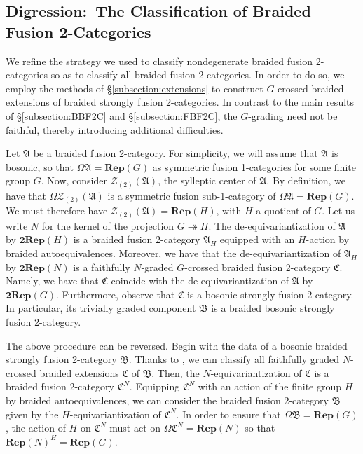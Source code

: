 \documentclass[11pt,reqno]{amsart}
\numberwithin{equation}{section}
\theoremstyle{plain}
\theoremstyle{definition}
\begin{document}
\subsection{Digression:\ The Classification of Braided Fusion 2-Categories}\label{subsection:allBraided}

We refine the strategy we used to classify nondegenerate braided fusion 2-categories so as to classify all braided fusion 2-categories.
In order to do so, we employ the methods of \S\ref{subsection:extensions} to construct $G$-crossed braided extensions of braided strongly fusion 2-categories. In contrast to the main results of \S\ref{subsection:BBF2C} and \S\ref{subsection:FBF2C}, the $G$-grading need not be faithful, thereby introducing additional difficulties.

Let $\mathfrak{A}$ be a braided fusion 2-category.
For simplicity, we will assume that $\mathfrak{A}$ is bosonic, so that $\Omega\mathfrak{A} = \mathbf{Rep}(G)$ as symmetric fusion 1-categories for some finite group $G$.
Now, consider $\mathcal{Z}_{(2)}(\mathfrak{A})$, the sylleptic center of $\mathfrak{A}$.
By definition, we have that $\Omega\mathcal{Z}_{(2)}(\mathfrak{A})$ is a symmetric fusion sub-1-category of $\Omega\mathfrak{A} = \mathbf{Rep}(G)$. We must therefore have $\mathcal{Z}_{(2)}(\mathfrak{A}) = \mathbf{Rep}(H)$, with $H$ a quotient of $G$. Let us write $N$ for the kernel of the projection $G\twoheadrightarrow H$.
The de-equivariantization of $\mathfrak{A}$ by $\mathbf{2Rep}(H)$ is a braided fusion 2-category $\mathfrak{A}_H$ equipped with an $H$-action by braided autoequivalences.
Moreover, we have that the de-equivariantization of $\mathfrak{A}_H$ by $\mathbf{2Rep}(N)$ is a faithfully $N$-graded $G$-crossed braided fusion 2-category $\mathfrak{C}$. Namely, we have that $\mathfrak{C}$ coincide with the de-equivariantization of $\mathfrak{A}$ by $\mathbf{2Rep}(G)$.
Furthermore, observe that $\mathfrak{C}$ is a bosonic strongly fusion 2-category.
In particular, its trivially graded component $\mathfrak{B}$ is a braided bosonic strongly fusion 2-category.

The above procedure can be reversed.
Begin with the data of a bosonic braided strongly fusion 2-category $\mathfrak{B}$.
Thanks to , we can classify all faithfully graded $N$-crossed braided extensions $\mathfrak{C}$ of $\mathfrak{B}$.
Then, the $N$-equivariantization of $\mathfrak{C}$ is a braided fusion 2-category $\mathfrak{C}^N$.
Equipping $\mathfrak{C}^N$ with an action of the finite group $H$ by braided autoequivalences, we can consider the braided fusion 2-category $\mathfrak{B}$ given by the $H$-equivariantization of $\mathfrak{C}^N$.
In order to ensure that $\Omega\mathfrak{B} = \mathbf{Rep}(G)$, the action of $H$ on $\mathfrak{C}^N$ must act on $\Omega\mathfrak{C}^N=\mathbf{Rep}(N)$ so that $\mathbf{Rep}(N)^H = \mathbf{Rep}(G)$.
\end{document}
